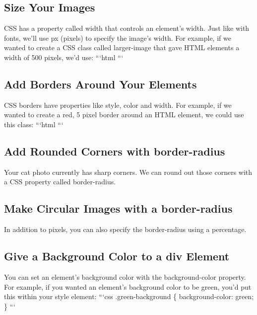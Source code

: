\documentclass{article}%
\begin{document}
%
\subsection{Size Your Images}%
\label{subsec:SizeYourImages}%
CSS has a property called width that controls an element's width. Just like with fonts, we'll use px (pixels) to specify the image's width.\newline%
For example, if we wanted to create a CSS class called larger{-}image that gave HTML elements a width of 500 pixels, we'd use:\newline%
```html\newline%
```\newline%

%
\subsection{Add Borders Around Your Elements}%
\label{subsec:AddBordersAroundYourElements}%
CSS borders have properties like style, color and width.\newline%
For example, if we wanted to create a red, 5 pixel border around an HTML element, we could use this class:\newline%
```html\newline%
```\newline%

%
\subsection{Add Rounded Corners with border{-}radius}%
\label{subsec:AddRoundedCornerswithborder{-}radius}%
Your cat photo currently has sharp corners. We can round out those corners with a CSS property called border{-}radius.\newline%

%
\subsection{Make Circular Images with a border{-}radius}%
\label{subsec:MakeCircularImageswithaborder{-}radius}%
In addition to pixels, you can also specify the border{-}radius using a percentage.\newline%

%
\subsection{Give a Background Color to a div Element}%
\label{subsec:GiveaBackgroundColortoadivElement}%
You can set an element's background color with the background{-}color property.\newline%
For example, if you wanted an element's background color to be green, you'd put this within your style element:\newline%
```css\newline%
.green{-}background \{\newline%
  background{-}color: green;\newline%
\}\newline%
```\newline%
\end{document}
